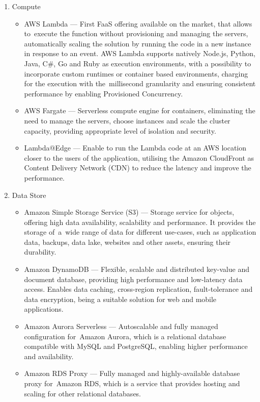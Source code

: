 \begin{enumerate}
   \item Compute
   \begin{itemize}
       \item AWS Lambda --- First FaaS offering available on the market, that allows to~execute the function without provisioning and managing the servers, automatically scaling the solution by running the code in a new instance in response to an event. AWS Lambda supports natively Node.js, Python, Java, C\#, Go and Ruby as execution environments, with a possibility to incorporate custom runtimes or container based environments, charging for the execution with the~millisecond granularity and ensuring consistent performance by enabling Provisioned Concurrency.
       \item AWS Fargate --- Serverless compute engine for containers, eliminating the need to manage the servers, choose instances and scale the cluster capacity, providing appropriate level of isolation and security.
       \item Lambda@Edge --- Enable to run the Lambda code at an AWS location closer to the users of the application, utilising the Amazon CloudFront as Content Delivery Network (CDN) to reduce the latency and improve the performance.
   \end{itemize}
   \item Data Store
   \begin{itemize}
       \item Amazon Simple Storage Service (S3) --- Storage service for objects, offering high data availability, scalability and performance. It provides the storage of~a~wide range of data for different use-cases, such as application data, backups, data lake, websites and other assets, ensuring their durability.
       \item Amazon DynamoDB --- Flexible, scalable and distributed key-value and document database, providing high performance and low-latency data access. Enables data caching, cross-region replication, fault-tolerance and data encryption, being a suitable solution for web and mobile applications.
       \item Amazon Aurora Serverless --- Autoscalable and fully managed configuration for~Amazon Aurora, which is a relational database compatible with MySQL and PostgreSQL, enabling higher performance and availability.
       \item Amazon RDS Proxy --- Fully managed and highly-available database proxy for~Amazon RDS, which is a service that provides hosting and scaling for other relational databases.

\end{itemize}
\end{enumerate}
